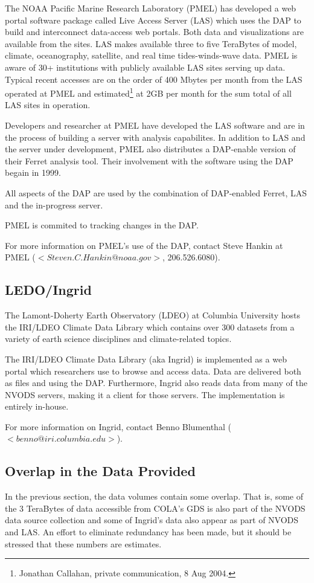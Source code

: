 \documentclass[justify]{dods-paper}
\begin{document}
The NOAA Pacific Marine Research Laboratory (PMEL) has developed a web portal
software package called Live Access Server (LAS) which uses the DAP to build
and interconnect data-access web portals. Both data and visualizations are
available from the sites. LAS makes available three to five TeraBytes of
model, climate, oceanography, satellite, and real time tides-winds-wave data.
PMEL is aware of 30+ institutions with publicly available LAS sites serving
up data. Typical recent accesses are on the order of 400 Mbytes per month
from the LAS operated at PMEL and estimated\footnote{Jonathan Callahan,
private communication, 8 Aug 2004.} at 2GB per month for the sum total of
all LAS sites in operation.

Developers and researcher at PMEL have developed the LAS software and are in
the process of building a server with analysis capabilites. In addition to
LAS and the server under development, PMEL also distributes a DAP-enable
version of their Ferret analysis tool. Their involvement with the software
using the DAP begain in 1999.

All aspects of the DAP are used by the combination of DAP-enabled Ferret, LAS
and the in-progress server.

PMEL is commited to tracking changes in the DAP.

For more information on PMEL's use of the DAP, contact Steve Hankin at PMEL
($<Steven.C.Hankin@noaa.gov>$, 206.526.6080).

\subsection{LEDO/Ingrid}

The Lamont-Doherty Earth Observatory (LDEO) at Columbia University hosts the
IRI/LDEO Climate Data Library which contains over 300 datasets from a variety
of earth science disciplines and climate-related topics.

The IRI/LDEO Climate Data Library (aka Ingrid) is implemented as a web portal
which researchers use to browse and access data. Data are delivered both as
files and using the DAP. Furthermore, Ingrid also reads data from many of the
NVODS servers, making it a client for those servers. The implementation is
entirely in-house.

For more information on Ingrid, contact Benno Blumenthal
($<benno@iri.columbia.edu>$).

\subsection{Overlap in the Data Provided}

In the previous section, the data volumes contain some overlap. That is, some
of the 3 TeraBytes of data accessible from COLA's GDS is also part of the
NVODS data source collection and some of Ingrid's data also appear as part of
NVODS and LAS. An effort to eliminate redundancy has been made, but it should
be stressed that these numbers are estimates.
\end{document}
